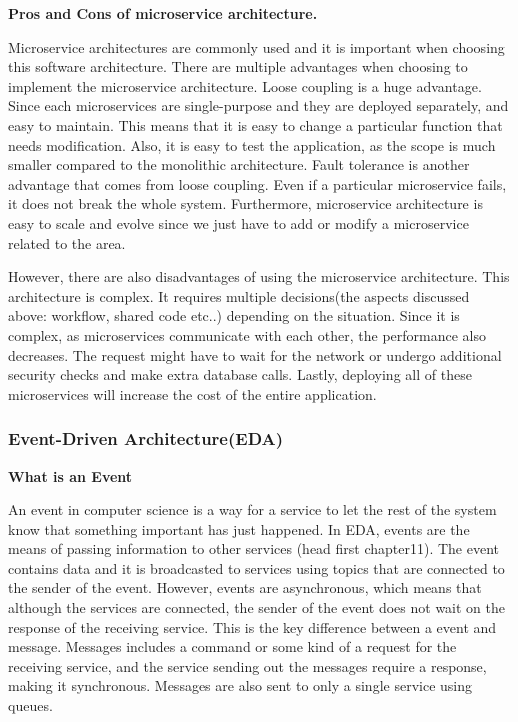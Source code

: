 \noindent \textbf{Pros and Cons of microservice architecture.}

Microservice architectures are commonly used and it is important when choosing this software architecture. 
There are multiple advantages when choosing to implement the microservice architecture. 
Loose coupling is a huge advantage. Since each microservices are single-purpose and they are deployed separately, 
and easy to maintain. This means that it is easy to change a particular function that needs modification. 
Also, it is easy to test the application, as the scope is much smaller compared to the monolithic architecture. 
Fault tolerance is another advantage that comes from loose coupling. Even if a particular microservice fails, 
it does not break the whole system. Furthermore, microservice architecture is easy to scale and evolve since we just have to add or 
modify a microservice related to the area. 

However, there are also disadvantages of using the microservice architecture. 
This architecture is complex. It requires multiple decisions(the aspects discussed above: workflow, shared code etc..) 
depending on the situation. Since it is complex, as microservices communicate with each other, the performance also decreases.
The request might have to wait for the network or undergo additional security checks and make extra database calls.
Lastly, deploying all of these microservices will increase the cost of the entire application.  

\subsubsection[Event-Driven Architecture(EDA)]{Event-Driven Architecture(EDA)}
\noindent \textbf{What is an Event}

An event in computer science is a way for a service to let the rest of the system know that something important has just happened. In EDA, events are the means of passing information to other services (head first chapter11). The event contains data and it is broadcasted to services using topics that are connected to the sender of the event. However, events are asynchronous, which means that although the services are connected, the sender of the event does not wait on the response of the receiving service. This is the key difference between a event and message. Messages includes a command or some kind of a request for the receiving service, and the service sending out the messages require a response, making it synchronous. Messages are also sent to only a single service using queues. 

